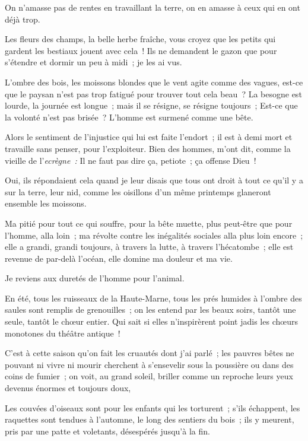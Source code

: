 \documentclass[french,twoside]{book} %
\begin{document}
On n’amasse pas de rentes en travaillant la terre, on en amasse à ceux qui en ont déjà trop.\par
Les fleurs des champs, la belle herbe fraîche, vous croyez que les petits qui gardent les bestiaux jouent avec cela ! Ils ne demandent le gazon que pour s’étendre et dormir un peu à midi ; je les ai vus.\par
L’ombre des bois, les moissons blondes que le vent agite comme des vagues, est-ce que le paysan n’est pas trop fatigué pour trouver tout cela beau ? La besogne est lourde, la journée est longue ; mais il se résigne, se résigne toujours ; Est-ce que la volonté n’est pas brisée ? L’homme est surmené comme une bête.\par
Alors le sentiment de l’injustice qui lui est  faite l’endort ; il est à demi mort et travaille sans penser, pour l’exploiteur. Bien des hommes, m’ont dit, comme la vieille de l’\emph{ecrègne :} Il ne faut pas dire ça, petiote ; ça offense Dieu !\par
Oui, ils répondaient cela quand je leur disais que tous ont droit à tout ce qu’il y a sur la terre, leur nid, comme les oisillons d’un même printemps glaneront ensemble les moissons.\par
Ma pitié pour tout ce qui souffre, pour la bête muette, plus peut-être que pour l’homme, alla loin ; ma révolte contre les inégalités sociales alla plus loin encore ; elle a grandi, grandi toujours, à travers la lutte, à travers l’hécatombe ; elle est revenue de par-delà l’océan, elle domine ma douleur et ma vie.\par
Je reviens aux duretés de l’homme pour l’animal.\par
En été, tous les ruisseaux de la Haute-Marne, tous les prés humides à l’ombre des saules sont remplis de grenouilles ; on les entend par les beaux soirs, tantôt une seule, tantôt le chœur entier. Qui sait si elles n’inspirèrent point jadis les chœurs monotones du théâtre antique !\par
C’est à cette saison qu’on fait les cruautés dont j’ai parlé ; les pauvres bêtes ne pouvant ni vivre ni mourir cherchent à s’ensevelir sous la poussière ou dans des coins de fumier ; on voit, au  grand soleil, briller comme un reproche leurs yeux devenus énormes et toujours doux,\par
Les couvées d’oiseaux sont pour les enfants qui les torturent ; s’ils échappent, les raquettes sont tendues à l’automne, le long des sentiers du bois ; ils y meurent, pris par une patte et voletants, désespérés jusqu’à la fin.\par
\end{document}

